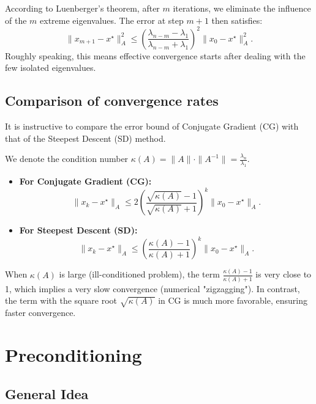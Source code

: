 According to Luenberger's theorem, after $m$ iterations, we eliminate the influence of the $m$ extreme eigenvalues. The error at step $m+1$ then satisfies:
\[
\|x_{m+1} - x^\star\|_A^2 \le \left( \frac{\lambda_{n-m} - \lambda_1}{\lambda_{n-m} + \lambda_1} \right)^2 \|x_0 - x^\star\|_A^2.
\]
Roughly speaking, this means effective convergence starts after dealing with the few isolated eigenvalues.

\subsection{Comparison of convergence rates}

It is instructive to compare the error bound of Conjugate Gradient (CG) with that of the Steepest Descent (SD) method.

We denote the condition number $\kappa(A) = \|A\| \cdot \|A^{-1}\| = \frac{\lambda_n}{\lambda_1}$.

\begin{itemize}
    \item \textbf{For Conjugate Gradient (CG):}
    \[
    \|x_k - x^\star\|_A \le 2 \left( \frac{\sqrt{\kappa(A)} - 1}{\sqrt{\kappa(A)} + 1} \right)^k \|x_0 - x^\star\|_A.
    \]

    \item \textbf{For Steepest Descent (SD):}
    \[
    \|x_k - x^\star\|_A \le \left( \frac{\kappa(A) - 1}{\kappa(A) + 1} \right)^k \|x_0 - x^\star\|_A.
    \]
\end{itemize}

\begin{remarque}
When $\kappa(A)$ is large (ill-conditioned problem), the term $\frac{\kappa(A)-1}{\kappa(A)+1}$ is very close to 1, which implies a very slow convergence (numerical "zigzagging").
In contrast, the term with the square root $\sqrt{\kappa(A)}$ in CG is much more favorable, ensuring faster convergence.
\end{remarque}

\section{Preconditioning}
\label{sec:preconditioning}

\subsection{General Idea}

